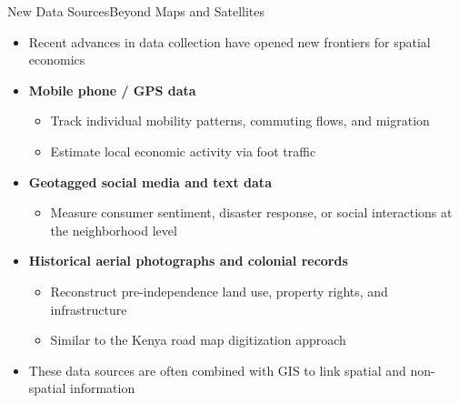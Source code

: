 \documentclass[hyperref={pdfpagelabels=false}]{beamer}
\begin{document}
\begin{frame}{New Data Sources}{Beyond Maps and Satellites}
\begin{itemize}
	\item Recent advances in data collection have opened new frontiers for spatial economics
	\vspace{0.2cm}
	\item \textbf{Mobile phone / GPS data}
	\begin{itemize}
		\vspace{0.1cm}
		\item Track individual mobility patterns, commuting flows, and migration
		\vspace{0.1cm}
		\item Estimate local economic activity via foot traffic
	\end{itemize}
	\vspace{0.2cm}
	\item \textbf{Geotagged social media and text data}
	\begin{itemize}
		\vspace{0.1cm}
		\item Measure consumer sentiment, disaster response, or social interactions at the neighborhood level
	\end{itemize}
	\vspace{0.2cm}
	\item \textbf{Historical aerial photographs and colonial records}
	\begin{itemize}
		\vspace{0.1cm}
		\item Reconstruct pre-independence land use, property rights, and infrastructure
		\vspace{0.1cm}
		\item Similar to the Kenya road map digitization approach
	\end{itemize}
	\vspace{0.2cm}
	\item These data sources are often combined with GIS to link spatial and non-spatial information
\end{itemize}
\end{frame}
\end{document}
